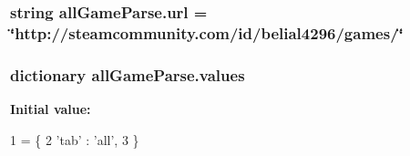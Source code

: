 \hypertarget{namespaceall_game_parse_af48967d69b2b722ff05ad284da8f4bfe}{
\subsubsection[{url}]{\setlength{\rightskip}{0pt plus 5cm}string all\+Game\+Parse.\+url = \char`\"{}http\+://steamcommunity.\+com/id/belial4296/games/\char`\"{}}}\label{namespaceall_game_parse_af48967d69b2b722ff05ad284da8f4bfe}
\hypertarget{namespaceall_game_parse_a25e198ad333ea40e9d4eca9e8ac0ce59}{
\subsubsection[{values}]{\setlength{\rightskip}{0pt plus 5cm}dictionary all\+Game\+Parse.\+values}}\label{namespaceall_game_parse_a25e198ad333ea40e9d4eca9e8ac0ce59}
{\bfseries Initial value\+:}
\begin{DoxyCode}
1 = \{
2     \textcolor{stringliteral}{'tab'} : \textcolor{stringliteral}{'all'},
3     \}
\end{DoxyCode}
